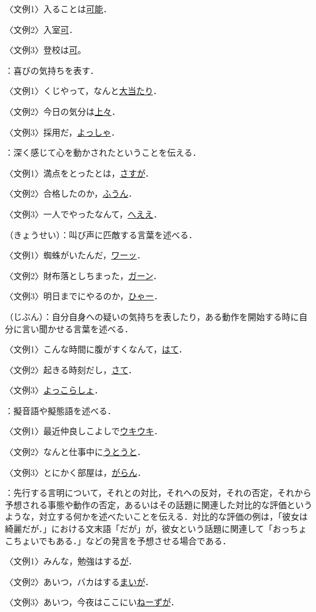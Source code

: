 \documentclass[japanese]{jnlp_1.4}
\newcommand{\InH}[1]{}
\begin{document}
〈文例1〉入ることは\ul{可能}．

〈文例2〉入室\ul{可}．

〈文例3〉登校は\ul{可}。

\InH{(10)}
：喜びの気持ちを表す．

〈文例1〉くじやって，なんと\ul{大当たり}．

〈文例2〉今日の気分は\ul{上々}．

〈文例3〉採用だ，\ul{よっしゃ}．

\InH{(11)}
：深く感じて心を動かされたということを伝える．

〈文例1〉満点をとったとは，\ul{さすが}．

〈文例2〉合格したのか，\ul{ふうん}．

〈文例3〉一人でやったなんて，\ul{へええ}．

\InH{(12)}
（きょうせい）：叫び声に匹敵する言葉を述べる．

〈文例1〉蜘蛛がいたんだ，\ul{ワーッ}．

〈文例2〉財布落としちまった，\ul{ガーン}．

〈文例3〉明日までにやるのか，\ul{ひゃー}．

\InH{(13)}
（じぶん）：自分自身への疑いの気持ちを表したり，ある動作を開始する時に自分に言い聞かせる言葉を述べる．

〈文例1〉こんな時間に腹がすくなんて，\ul{はて}．

〈文例2〉起きる時刻だし，\ul{さて}．

〈文例3〉\ul{よっこらしょ}．

\InH{(14)}
：擬音語や擬態語を述べる．

〈文例1〉最近仲良しこよしで\ul{ウキウキ}．

〈文例2〉なんと仕事中に\ul{うとうと}．

〈文例3〉とにかく部屋は，\ul{がらん}．

\InH{(15)}
：先行する言明について，それとの対比，それへの反対，それの否定，それから予想される事態や動作の否定，あるいはその話題に関連した対比的な評価というような，対立する何かを述べたいことを伝える．対比的な評価の例は，「彼女は綺麗だが．」における文末語「だが」が，彼女という話題に関連して「おっちょこちょいでもある．」などの発言を予想させる場合である．

〈文例1〉みんな，勉強はする\ul{が}．

〈文例2〉あいつ，バカはする\ul{まいが}．

〈文例3〉あいつ，今夜はここにい\ul{ねーずが}．
\end{document}
